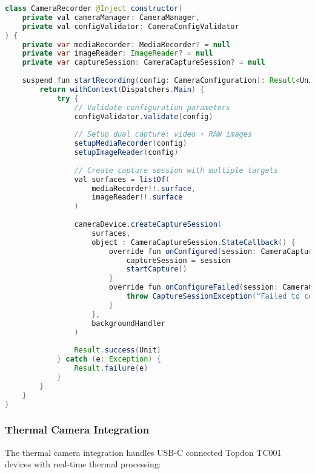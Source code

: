 \documentclass[11pt,a4paper]{report}
\begin{document}
\begin{lstlisting}[language=Java]
class CameraRecorder @Inject constructor(
    private val cameraManager: CameraManager,
    private val configValidator: CameraConfigValidator
) {
    private var mediaRecorder: MediaRecorder? = null
    private var imageReader: ImageReader? = null
    private var captureSession: CameraCaptureSession? = null
    
    suspend fun startRecording(config: CameraConfiguration): Result<Unit> {
        return withContext(Dispatchers.Main) {
            try {
                // Validate configuration parameters
                configValidator.validate(config)
                
                // Setup dual capture: video + RAW images
                setupMediaRecorder(config)
                setupImageReader(config)
                
                // Create capture session with multiple targets
                val surfaces = listOf(
                    mediaRecorder!!.surface,
                    imageReader!!.surface
                )
                
                cameraDevice.createCaptureSession(
                    surfaces,
                    object : CameraCaptureSession.StateCallback() {
                        override fun onConfigured(session: CameraCaptureSession) {
                            captureSession = session
                            startCapture()
                        }
                        override fun onConfigureFailed(session: CameraCaptureSession) {
                            throw CaptureSessionException("Failed to configure capture session")
                        }
                    },
                    backgroundHandler
                )
                
                Result.success(Unit)
            } catch (e: Exception) {
                Result.failure(e)
            }
        }
    }
}
\end{lstlisting}

\subsubsection{Thermal Camera Integration}

The thermal camera integration handles USB-C connected Topdon TC001 devices with real-time thermal processing:
\end{document}
